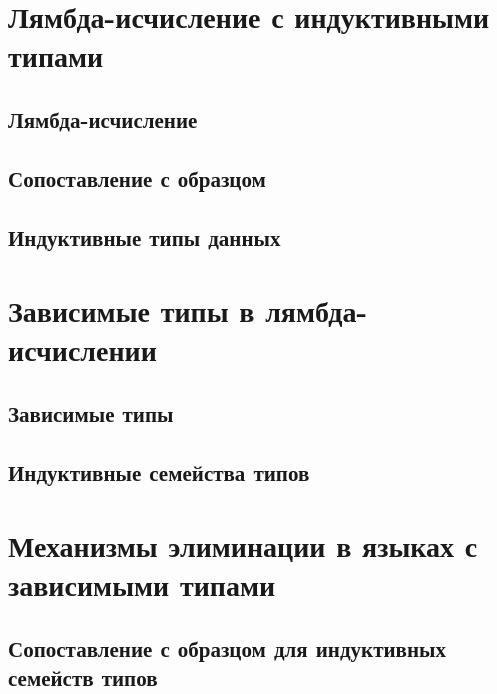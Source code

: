 \documentclass[14pt, a4paper]{extarticle}
\begin{document}


\newpage
\setcounter{page}{2}
\tableofcontents

\newpage
\section{Лямбда-исчисление с индуктивными типами}

\subsection{Лямбда-исчисление}


\subsection{Сопоставление с образцом}


\subsection{Индуктивные типы данных}


\newpage
\section{Зависимые типы в лямбда-исчислении}

\subsection{Зависимые типы}


\subsection{Индуктивные семейства типов}


\newpage
\section{Механизмы элиминации в языках с зависимыми типами}

\subsection{Сопоставление с образцом для индуктивных семейств типов}

\end{document}
